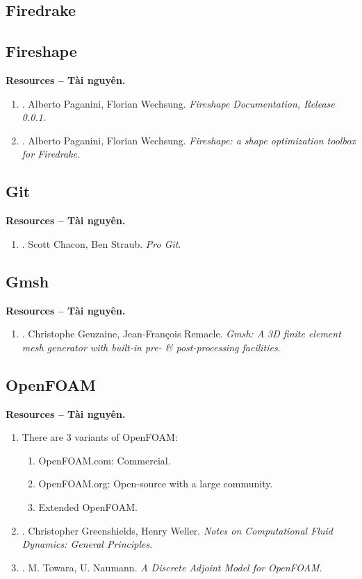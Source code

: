 \documentclass{article}
\begin{document}
\subsection{Firedrake}

\subsection{Fireshape}
\textbf{\textsf{Resources -- Tài nguyên.}}
\begin{enumerate}
	\item \cite{Paganini_Wechsung_Fireshape2020}. {\sc Alberto Paganini, Florian Wechsung}. {\it Fireshape Documentation, Release 0.0.1}.
	\item \cite{Paganini_Wechsung2020}. {\sc Alberto Paganini, Florian Wechsung}. {\it Fireshape: a shape optimization toolbox for Firedrake}.
\end{enumerate}

\subsection{Git}
\textbf{\textsf{Resources -- Tài nguyên.}}
\begin{enumerate}
	\item \cite{Chacon_Straub2014}. {\sc Scott Chacon, Ben Straub}. {\it Pro Git}.
\end{enumerate}

\subsection{Gmsh}
\textbf{\textsf{Resources -- Tài nguyên.}}
\begin{enumerate}
	\item \cite{Geuzaine_Remacle2009}. {\sc Christophe Geuzaine, Jean-Fran\c{c}ois Remacle}. {\it Gmsh: A 3D finite element mesh generator with built-in pre- \& post-processing facilities}.
\end{enumerate}

\subsection{OpenFOAM}
\textbf{\textsf{Resources -- Tài nguyên.}}
\begin{enumerate}
	\item There are 3 variants of OpenFOAM:
	\begin{enumerate}
		\item OpenFOAM.com: Commercial.
		\item OpenFOAM.org: Open-source with a large community.
		\item Extended OpenFOAM.
	\end{enumerate}
	\item \cite{Greenshields_Weller2022}. {\sc Christopher Greenshields, Henry Weller}. {\it Notes on Computational Fluid Dynamics: General Principles}.
	\item \cite{Towara_Naumann2013}. {\sc M. Towara, U. Naumann}. {\it A Discrete Adjoint Model for OpenFOAM}.
\end{enumerate}
\end{document}
